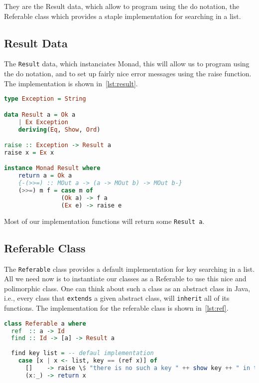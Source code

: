 They are the Result data, which allow to program using the do notation, the
Referable class which provides a staple implementation for searching in a list.

\subsection{Result Data}
The \texttt{Result} data, which instanciates Monad, this will allow us to
program using the do notation, and to set up fairly nice error messages using
the raise function. The implementation is shown in~\cref{lst:result}.

\begin{lstlisting}[language=Haskell, frame=single, caption={Result Data Implementation}, label={lst:result}, float,floatplacement=H]
type Exception = String

data Result a = Ok a
	| Ex Exception
	deriving(Eq, Show, Ord)

raise :: Exception -> Result a
raise x = Ex x 

instance Monad Result where
	return a = Ok a
	{-(>>=) :: MOut a -> (a -> MOut b) -> MOut b-}
	(>>=) m f = case m of 
				(Ok a) -> f a
				(Ex e) -> raise e
\end{lstlisting}
Most of our implementation functions will return some \texttt{Result a}.

\subsection{Referable Class}

The \texttt{Referable} class provides a default implementation for key
searching in a list. All we need now is to instantiate our classes as a
Referable to use this nice and polimorphic class.  One can think about such a
class as an abstract class in Java, i.e., every class that \texttt{extends} a
given abstract class, will \texttt{inherit} all of its functions. The
implementation for the referable class is shown in~\cref{lst:ref}.

\begin{lstlisting}[language=Haskell, frame=single, caption={The Referable Class Implementation}, label={lst:ref}, float, floatplacement=H]
class Referable a where 
  ref  :: a -> Id
  find :: Id -> [a] -> Result a
 
  find key list = -- defaul implementation
    case [x | x <- list, key == (ref x)] of
      []    -> raise \$ "there is no such a key " ++ show key ++ " in the list."
      (x:_) -> return x  
\end{lstlisting}
      
